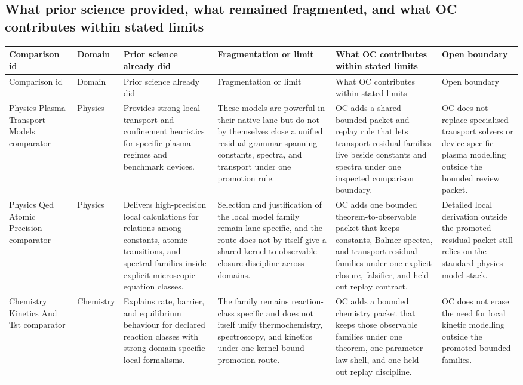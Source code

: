 \subsection{What prior science provided, what remained fragmented, and what OC contributes within stated limits}
\begingroup
\scriptsize
\setlength{\emergencystretch}{1.5em}
\setlength{\tabcolsep}{2pt}
\setlength{\LTleft}{0pt}
\setlength{\LTright}{0pt}
\begin{longtable}{@{}L{0.17\textwidth}L{0.09\textwidth}L{0.17\textwidth}L{0.17\textwidth}L{0.20\textwidth}L{0.14\textwidth}@{}}
\toprule
Comparison id & Domain & Prior science already did & Fragmentation or limit & What OC contributes within stated limits & Open boundary \\
\midrule
\endfirsthead
\toprule
Comparison id & Domain & Prior science already did & Fragmentation or limit & What OC contributes within stated limits & Open boundary \\
\midrule
\endhead
Physics Plasma Transport Models comparator & Physics & Provides strong local transport and confinement heuristics for specific plasma regimes and benchmark devices. & These models are powerful in their native lane but do not by themselves close a unified residual grammar spanning constants, spectra, and transport under one promotion rule. & OC adds a shared bounded packet and replay rule that lets transport residual families live beside constants and spectra under one inspected comparison boundary. & OC does not replace specialised transport solvers or device-specific plasma modelling outside the bounded review packet. \\
Physics Qed Atomic Precision comparator & Physics & Delivers high-precision local calculations for relations among constants, atomic transitions, and spectral families inside explicit microscopic equation classes. & Selection and justification of the local model family remain lane-specific, and the route does not by itself give a shared kernel-to-observable closure discipline across domains. & OC adds one bounded theorem-to-observable packet that keeps constants, Balmer spectra, and transport residual families under one explicit closure, falsifier, and held-out replay contract. & Detailed local derivation outside the promoted residual packet still relies on the standard physics model stack. \\
Chemistry Kinetics And Tst comparator & Chemistry & Explains rate, barrier, and equilibrium behaviour for declared reaction classes with strong domain-specific local formalisms. & The family remains reaction-class specific and does not itself unify thermochemistry, spectroscopy, and kinetics under one kernel-bound promotion route. & OC adds a bounded chemistry packet that keeps those observable families under one theorem, one parameter-law shell, and one held-out replay discipline. & OC does not erase the need for local kinetic modelling outside the promoted bounded families. \\

\end{longtable}
